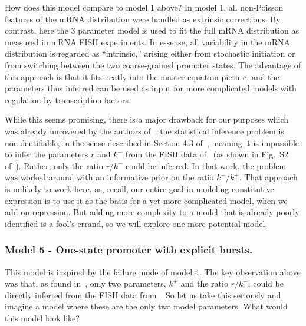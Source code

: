 \documentclass[12pt]{article}%
\begin{document}
How does this model compare to model 1 above?
In model 1, all non-Poisson features of the mRNA
distribution were handled as extrinsic corrections.
By contrast, here the 3 parameter model is used to fit the full
mRNA distribution as measured in mRNA FISH experiments.
In essense, all variability in the mRNA distribution is regarded
as ``intrinsic,'' arising either from stochastic initiation or
from switching between the two coarse-grained promoter states.
The advantage of this approach is that it fits neatly into the
master equation picture, and the parameters thus inferred can be used as
input for more complicated models with regulation by transcription factors.

While this seems promising, there is a major drawback for our purposes
which was already uncovered by the authors of~\cite{Razo-Mejia2020}:
the statistical inference problem is nonidentifiable,
in the sense described in Section 4.3 of~\cite{Gelman2013},
meaning it is impossible to infer the
parameters $r$ and $k^-$ from the FISH data of~\cite{Jones2014}
(as shown in Fig.~S2 of~\cite{Razo-Mejia2020}).
Rather, only the ratio $r/k^-$ could be inferred. In that work,
the problem was worked around with an informative prior on the
ratio $k^-/k^+$. That approach is unlikely to work here, as,
recall, our entire goal in modeling constitutive expression is to
use it as the basis for a yet more complicated model, when we add
on repression. But adding more complexity to a model that is
already poorly identified is a fool's errand,
so we will explore one more potential model.

\subsubsection{Model 5 - One-state promoter with explicit bursts.}
This model is inspired by the failure mode of model 4.
The key observation above was that, as found
in~\cite{Razo-Mejia2020}, only two parameters, $k^+$ and the
ratio $r/k^-$, could be directly inferred from the FISH data
from~\cite{Jones2014}.
So let us take this seriously and imagine a model where these are
the only two model parameters. What would this model look like?
\end{document}
